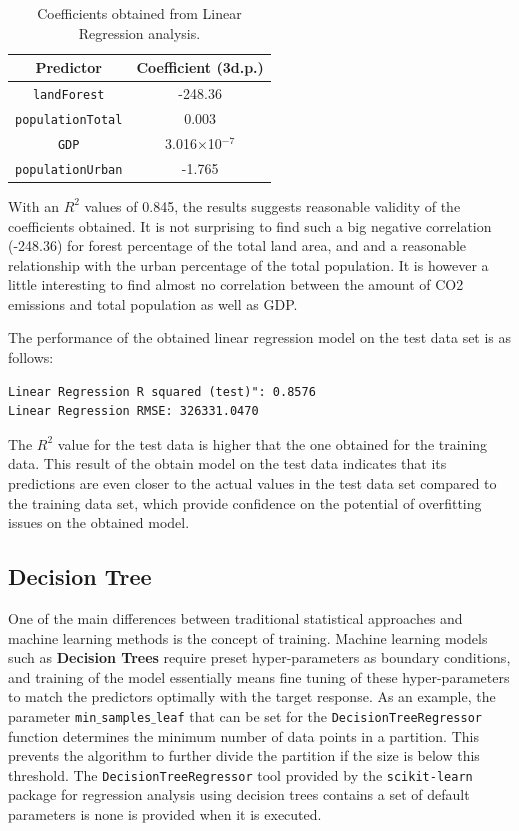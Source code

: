 \documentclass[11pt,a4paper,titlepage]{article}
\begin{document}
\begin{table}[htbp!]
    \begin{center}
        \begin{tabular}{ |c|c| } 
        \hline
        Predictor & Coefficient (3d.p.) \\ 
        \hline
        \texttt{landForest} & -248.36\\
        \texttt{populationTotal} & 0.003 \\
        \texttt{GDP} & 3.016$\times$10$^{-7}$ \\
        \texttt{populationUrban} & -1.765 \\
        \hline
        \end{tabular}
        \caption{Coefficients obtained from Linear Regression analysis.}
        \label{LinearRegressionCoeffs}
    \end{center}
\end{table}

With an $R^{2}$ values of 0.845, the results suggests reasonable validity of the coefficients obtained. It is not surprising to find such a big negative correlation (-248.36) for forest percentage of the total land area, and and a reasonable relationship with the urban percentage of the total population. It is however a little interesting to find almost no correlation between the amount of CO2 emissions and total population as well as GDP.

The performance of the obtained linear regression model on the test data set is as follows:

\begin{verbatim}
Linear Regression R squared (test)": 0.8576
Linear Regression RMSE: 326331.0470
\end{verbatim}

The $R^{2}$ value for the test data is higher that the one obtained for the training data. This result of the obtain model on the test data indicates that its predictions are even closer to the actual values in the test data set compared to the training data set, which provide confidence on the potential of overfitting issues on the obtained model.

\subsection{Decision Tree}

One of the main differences between traditional statistical approaches and machine learning methods is the concept of training. Machine learning models such as \textbf{Decision Trees} require preset hyper-parameters as boundary conditions, and training of the model essentially means fine tuning of these hyper-parameters to match the predictors optimally with the target response. As an example, the parameter \texttt{min$\_$samples$\_$leaf} that can be set for the \texttt{DecisionTreeRegressor} function determines the minimum number of data points in a partition. This prevents the algorithm to further divide the partition if the size is below this threshold. The \texttt{DecisionTreeRegressor} tool provided by the \texttt{scikit-learn} package for regression analysis using decision trees contains a set of default parameters is none is provided when it is executed.
\end{document}

